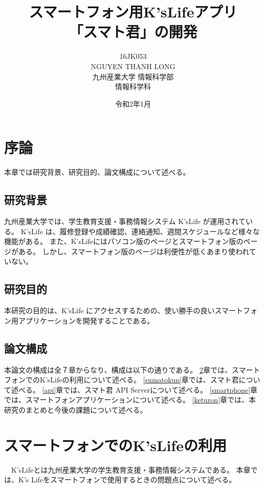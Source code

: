 \documentclass[a4j,12pt,onecolumn,oneside,titlepage,openany,final]{jreport}
\title{
 \Huge{スマートフォン用K'sLifeアプリ}\\
 \Huge{「スマト君」の開発}
 \vspace{5.5cm}\\
}
\author{\LARGE{16JK053}\vspace{0.5cm}\\
\LARGE{NGUYEN THANH LONG}\vspace{2cm}\\
\LARGE{九州産業大学 情報科学部}\vspace{0.5cm}\\
\LARGE{情報科学科}\vspace{1cm}\\
\date{\LARGE{令和2年1月}}
}
\begin{document}
\maketitle
\tableofcontents
\listoffigures
\listoftables




\chapter{序論}\label{joron}

本章では研究背景、研究目的、論文構成について述べる。
\section{研究背景}\label{haikei}
九州産業大学では、学生教育支援・事務情報システム K'sLife\cite{kslife} が運用されている。
K'sLife は、履修登録や成績確認、連絡通知、週間スケジュールなど様々な機能がある。
また、K'sLifeにはパソコン版のページとスマートフォン版のページがある。
しかし、スマートフォン版のページは利便性が低くあまり使われていない。



\section{研究目的}\label{mokuteki}
本研究の目的は、K'sLife にアクセスするための、使い勝手の良いスマートフォン用アプリケーションを開発することである。
\section{論文構成}\label{kousei}
本論文の構成は全７章からなり、構成は以下の通りである。
\ref{mondai}章では、スマートフォンでのK'sLifeの利用について述べる。
\ref{sumatokun}章では、スマト君について述べる。
\ref{api}章では、スマト君 API Serverについて述べる。
\ref{smartphone}章では、スマートフォンアプリケーションについて述べる。
\ref{keturon}章では、本研究のまとめと今後の課題について述べる。


\chapter{スマートフォンでのK'sLifeの利用}\label{mondai}
　K'sLifeとは九州産業大学の学生教育支援・事務情報システムである。
本章では、K's Lifeをスマートフォンで使用するときの問題点について述べる。
\end{document}
